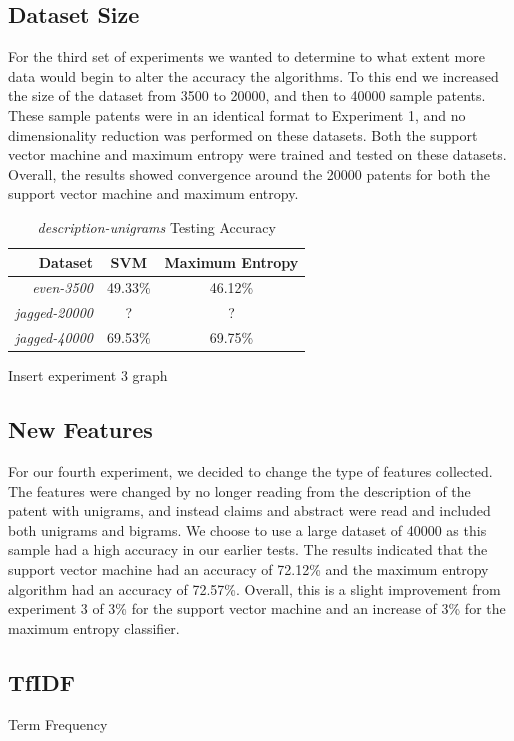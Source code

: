 \subsection{Dataset Size}
For the third set of experiments we wanted to determine to what extent more data would begin to alter the accuracy the algorithms.  To this end we increased the size of the dataset from 3500 to 20000, and then to 40000 sample patents.  These sample patents were in an identical format to Experiment 1, and no dimensionality reduction was performed on these datasets.  Both the support vector machine and maximum entropy were trained and tested on these datasets.  Overall, the results showed convergence around the 20000 patents for both the support vector machine and maximum entropy.


\begin{table}[Ht]
\caption{\emph{description-unigrams} Testing Accuracy}
\centering
\begin{tabular}{| r | c | c |}
\hline
Dataset & SVM & Maximum Entropy \\ \hline
\emph{even-3500} & 49.33\% & 46.12\% \\ \hline
\emph{jagged-20000} & ? & ? \\ \hline
\emph{jagged-40000} & 69.53\% & 69.75\% \\ \hline
\end{tabular}
\end{table}


Insert experiment 3 graph



\subsection{New Features}
For our fourth experiment, we decided to change the type of features collected.  The features were changed by no longer reading from the description of the patent with unigrams, and instead claims and abstract were read and included both unigrams and bigrams. We choose to use a large dataset of 40000 as this sample had a high accuracy in our earlier tests.  The results indicated that the support vector machine had an accuracy of 72.12\% and the maximum entropy algorithm had an accuracy of 72.57\%.  Overall, this is a slight improvement from experiment 3 of 3\% for the support vector machine and an increase of 3\% for the maximum entropy classifier.

\subsection{TfIDF}
Term Frequency
